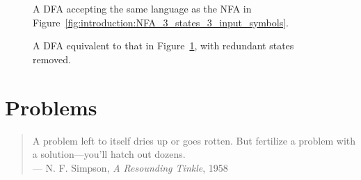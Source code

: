 \begin{figure}[!htbp]
\centering

\caption{A DFA accepting the same language as the NFA in
  Figure~\ref{fig:introduction:NFA_3_states_3_input_symbols}.}
\label{fig:introduction:DFA_accepting_same_language_as_NFA_3_states_3_input_symbols}
\end{figure}

\begin{figure}[!htbp]
\centering

\caption{A DFA equivalent to that in
  Figure~\ref{fig:introduction:DFA_accepting_same_language_as_NFA_3_states_3_input_symbols},
  with redundant states removed.}
\label{fig:introduction:another_DFA_accepting_same_language_as_NFA_3_states_3_input_symbols}
\end{figure}

\newpage



\section{Problems}

\begin{quote}
\footnotesize
A problem left to itself dries up or goes rotten. But fertilize a
problem with a solution---you'll hatch out dozens. \\
\noindent
--- N. F. Simpson, \emph{A Resounding Tinkle}, 1958
\end{quote}

